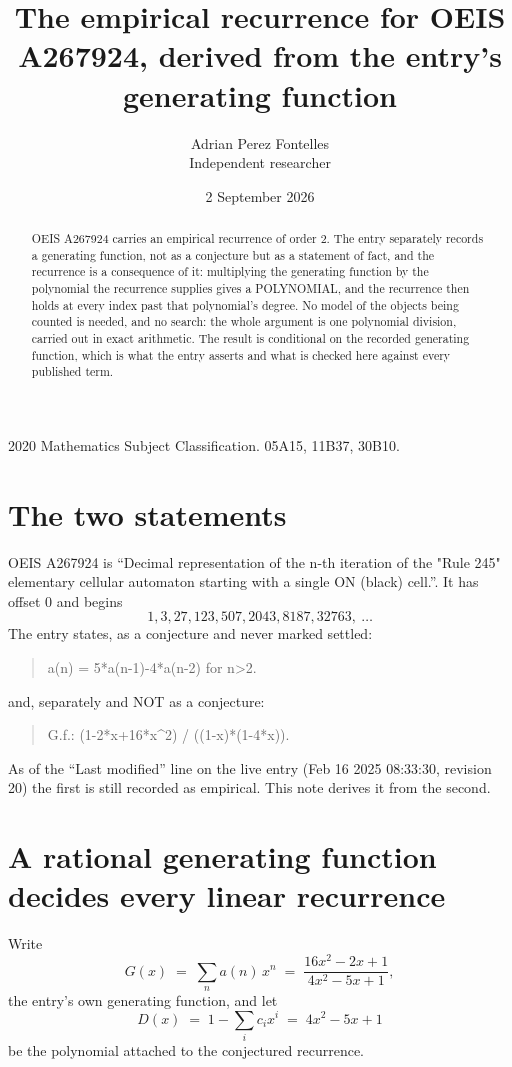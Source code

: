 \documentclass[11pt,a4paper]{article}
\title{The empirical recurrence for OEIS A267924, derived from the entry's generating function}
\author{Adrian Perez Fontelles\\ \small Independent researcher}
\date{2 September 2026}
\theoremstyle{plain}
\theoremstyle{definition}
\begin{document}
\maketitle

\begin{abstract}
OEIS A267924 carries an empirical recurrence of order $2$. The entry separately records a
generating function, not as a conjecture but as a statement of fact, and the recurrence is a
consequence of it: multiplying the generating function by the polynomial the recurrence
supplies gives a POLYNOMIAL, and the recurrence then holds at every index past that
polynomial's degree. No model of the objects being counted is needed, and no search: the
whole argument is one polynomial division, carried out in exact arithmetic. The result is
conditional on the recorded generating function, which is what the entry asserts and what is
checked here against every published term.
\end{abstract}

\noindent\small 2020 Mathematics Subject Classification. 05A15, 11B37, 30B10.\normalsize

\section{The two statements}

OEIS A267924 is ``Decimal representation of the n-th iteration of the "Rule 245" elementary cellular automaton starting with a single ON (black) cell.''. It has offset $0$ and begins
\[
1, 3, 27, 123, 507, 2043, 8187, 32763,\ \dots
\]
The entry states, as a conjecture and never marked settled:
\begin{quote}
a(n) = 5*a(n-1)-4*a(n-2) for n>2.
\end{quote}
and, separately and NOT as a conjecture:
\begin{quote}
G.f.: (1-2*x+16*x\^{}2) / ((1-x)*(1-4*x)).
\end{quote}
As of the ``Last modified'' line on the live entry (Feb 16 2025 08:33:30, revision 20) the first is still
recorded as empirical. This note derives it from the second.

\section{A rational generating function decides every linear recurrence}

Write
\[
G(x)\;=\;\sum_{n}a(n)\,x^{n}\;=\;\frac{16 x^{2} - 2 x + 1}{4 x^{2} - 5 x + 1},
\]
the entry's own generating function, and let
\[
D(x)\;=\;1-\sum_i c_i x^{i}\;=\;4 x^{2} - 5 x + 1
\]
be the polynomial attached to the conjectured recurrence.
\end{document}
